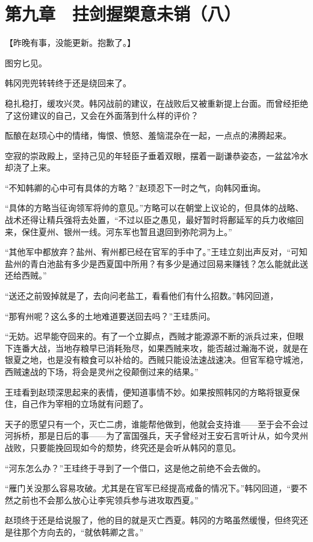 \section{第九章　拄剑握槊意未销（八）}

【昨晚有事，没能更新。抱歉了。】

图穷匕见。

韩冈兜兜转转终于还是绕回来了。

稳扎稳打，缓攻兴灵。韩冈战前的建议，在战败后又被重新提上台面。而曾经拒绝了这份建议的自己，又会在外面落到什么样的评价？

酝酿在赵顼心中的情绪，悔恨、愤怒、羞恼混杂在一起，一点点的沸腾起来。

空寂的崇政殿上，坚持己见的年轻臣子垂着双眼，摆着一副谦恭姿态，一盆盆冷水却浇了上来。

“不知韩卿的心中可有具体的方略？”赵顼忍下一时之气，向韩冈垂询。

“具体的方略当征询领军将帅的意见。”方略可以在朝堂上议论的，但具体的战略、战术还得让精兵强将去处置，“不过以臣之愚见，最好暂时将鄜延军的兵力收缩回来，保住夏州、银州一线。河东军也暂且退回到弥陀洞为上。”

“其他军中都放弃？盐州、宥州都已经在官军的手中了。”王珪立刻出声反对，“可知盐州的青白池盐有多少是西夏国中所用？有多少是通过回易来赚钱？怎么能就此送还给西贼。”

“送还之前毁掉就是了，去向问老盐工，看看他们有什么招数。”韩冈回道，

“那宥州呢？这么多的土地难道要送回去吗？”王珪质问。

“无妨。迟早能夺回来的。有了一个立脚点，西贼才能源源不断的派兵过来，但眼下连番大战，当地存粮早已消耗殆尽，如果西贼来攻，能否越过瀚海不说，就是在银夏之地，也是没有粮食可以补给的。西贼只能设法速战速决。但官军稳守城池，西贼速战的下场，将会是灵州之役颠倒过来的结果。”

王珪看到赵顼深思起来的表情，便知道事情不妙。如果按照韩冈的方略将银夏保住，自己作为宰相的立场就有问题了。

天子的愿望只有一个，灭亡二虏，谁能帮他做到，他就会支持谁——至于会不会过河拆桥，那是日后的事——为了富国强兵，天子曾经对王安石言听计从，如今灵州战败，只要能挽回现如今的颓势，终究还是会听从韩冈的意见。

“河东怎么办？”王珪终于寻到了一个借口，这是他之前绝不会去做的。

“雁门关没那么容易攻破。尤其是在官军已经提高戒备的情况下。”韩冈回道，“要不然之前也不会那么放心让李宪领兵参与进攻取西夏。”

赵顼终于还是给说服了，他的目的就是灭亡西夏。韩冈的方略虽然缓慢，但终究还是往那个方向去的，“就依韩卿之言。”

